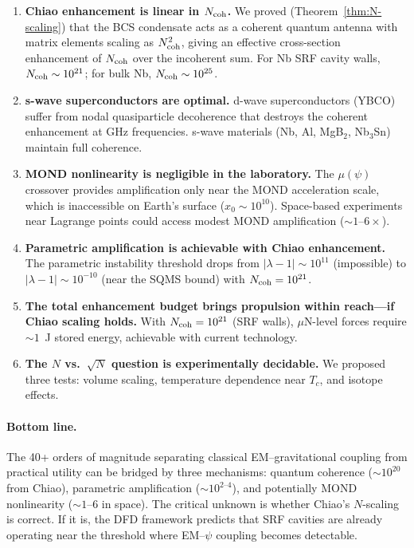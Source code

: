\documentclass[12pt,aps,prd,twocolumn,superscriptaddress,nofootinbib]{revtex4-2}
\newcommand{\lam}{\lambda}
\begin{document}
\begin{enumerate}
\item \textbf{Chiao enhancement is linear in $N_{\rm coh}$.}
We proved (Theorem~\ref{thm:N-scaling}) that the BCS condensate acts
as a coherent quantum antenna with matrix elements scaling as
$N_{\rm coh}^2$, giving an effective cross-section enhancement of
$N_{\rm coh}$ over the incoherent sum. For Nb SRF cavity walls,
$N_{\rm coh} \sim 10^{21}$; for bulk Nb, $N_{\rm coh} \sim 10^{25}$.

\item \textbf{s-wave superconductors are optimal.} d-wave
superconductors (YBCO) suffer from nodal quasiparticle decoherence
that destroys the coherent enhancement at GHz frequencies. s-wave
materials (Nb, Al, MgB$_2$, Nb$_3$Sn) maintain full coherence.

\item \textbf{MOND nonlinearity is negligible in the laboratory.}
The $\mu(\psi)$ crossover provides amplification only near the MOND
acceleration scale, which is inaccessible on Earth's surface
($x_0 \sim 10^{10}$). Space-based experiments near Lagrange points
could access modest MOND amplification ($\sim 1$--$6\times$).

\item \textbf{Parametric amplification is achievable with Chiao
enhancement.} The parametric instability threshold drops from
$|\lam-1| \sim 10^{11}$ (impossible) to $|\lam-1| \sim 10^{-10}$
(near the SQMS bound) with $N_{\rm coh} = 10^{21}$.

\item \textbf{The total enhancement budget brings propulsion within
reach---if Chiao scaling holds.} With $N_{\rm coh} = 10^{21}$
(SRF walls), $\mu$N-level forces require $\sim 1$~J stored energy,
achievable with current technology.

\item \textbf{The $N$ vs.\ $\sqrt{N}$ question is experimentally
decidable.} We proposed three tests: volume scaling, temperature
dependence near $T_c$, and isotope effects.
\end{enumerate}

\paragraph{Bottom line.} The 40+ orders of magnitude separating
classical EM--gravitational coupling from practical utility can be
bridged by three mechanisms: quantum coherence ($\sim 10^{20}$ from
Chiao), parametric amplification ($\sim 10^{2\text{--}4}$), and
potentially MOND nonlinearity ($\sim 1$--$6$ in space). The critical
unknown is whether Chiao's $N$-scaling is correct. If it is, the
DFD framework predicts that SRF cavities are already operating near
the threshold where EM--$\psi$ coupling becomes detectable.
\end{document}
